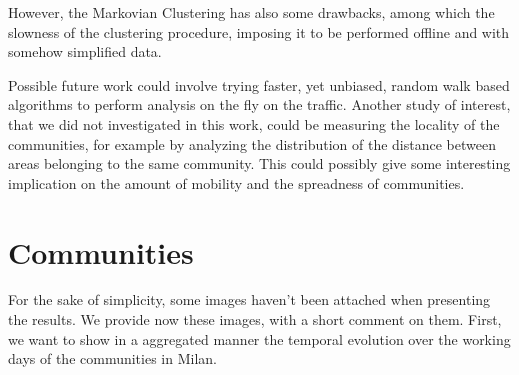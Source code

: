 \documentclass[12pt,a4paper]{article}
\begin{document}
However, the Markovian Clustering has also some drawbacks, among which the slowness of the clustering procedure,
imposing it to be performed offline and with somehow simplified data. 

Possible future work could involve trying faster, yet unbiased, random walk based algorithms to perform
analysis on the fly on the traffic. Another study of interest, that we did not investigated in this work, could be
measuring the locality of the communities, for example by analyzing the distribution of the distance between areas
belonging to the same community.
This could possibly give some interesting implication on the amount of mobility and the spreadness of communities.
\newpage

\appendix
\section{Communities}
\label{communities}
For the sake of simplicity, some images haven't been attached when presenting the results. We provide now these images, with a short comment on them.
First, we want to show in a aggregated manner the temporal evolution over the working days of the communities in Milan.
\end{document}
